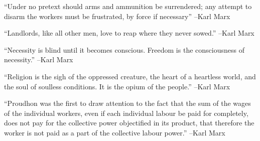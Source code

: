 \documentclass{article}%
\begin{document}
\linebreak%
\vspace{1mm}%
\begin{minipage}{\textwidth}%
\flushleft%
“Under no pretext should arms and ammunition be surrendered; any attempt to disarm the workers must be frustrated, by force if necessary”%
\linebreak%
\vspace{1mm}%
–Karl Marx%
\linebreak%
\vspace{1mm}%
\end{minipage}%
\linebreak%
\vspace{1mm}%
\begin{minipage}{\textwidth}%
\flushleft%
“Landlords, like all other men, love to reap where they never sowed.”%
\linebreak%
\vspace{1mm}%
–Karl Marx%
\linebreak%
\vspace{1mm}%
\end{minipage}%
\linebreak%
\vspace{1mm}%
\begin{minipage}{\textwidth}%
\flushleft%
“Necessity is blind until it becomes conscious. Freedom is the consciousness of necessity.”%
\linebreak%
\vspace{1mm}%
–Karl Marx%
\linebreak%
\vspace{1mm}%
\end{minipage}%
\linebreak%
\vspace{1mm}%
\begin{minipage}{\textwidth}%
\flushleft%
“Religion is the sigh of the oppressed creature, the heart of a heartless world, and the soul of soulless conditions. It is the opium of the people.”%
\linebreak%
\vspace{1mm}%
–Karl Marx%
\linebreak%
\vspace{1mm}%
\end{minipage}%
\linebreak%
\vspace{1mm}%
\begin{minipage}{\textwidth}%
\flushleft%
“Proudhon was the first to draw attention to the fact that the sum of the wages of the individual workers, even if each individual labour be paid for completely, does not pay for the collective power objectified in its product, that therefore the worker is not paid as a part of the collective labour power.”%
\linebreak%
\vspace{1mm}%
–Karl Marx%
\linebreak%
\vspace{1mm}%
\end{minipage}%
\end{document}
